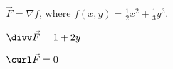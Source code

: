 {$\vec F = \nabla f$, where $f(x,y) = \frac12x^2+\frac13y^3$.
}
{$\divv \vec F = 1+2y$

$\curl\vec F = 0$
}
